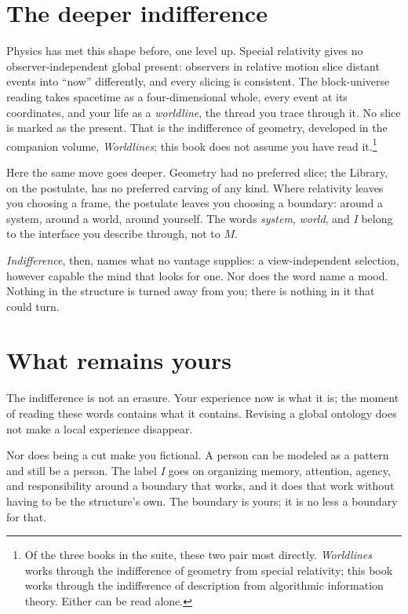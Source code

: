 \section*{The deeper indifference}

Physics has met this shape before, one level up. Special relativity gives no observer-independent global present: observers in relative motion slice distant events into ``now'' differently, and every slicing is consistent. The block-universe reading takes spacetime as a four-dimensional whole, every event at its coordinates, and your life as a \emph{worldline}, the thread you trace through it. No slice is marked as the present. That is the indifference of geometry, developed in the companion volume, \textit{Worldlines}; this book does not assume you have read it.\footnote{Of the three books in the suite, these two pair most directly. \textit{Worldlines} works through the indifference of geometry from special relativity; this book works through the indifference of description from algorithmic information theory. Either can be read alone.}

Here the same move goes deeper. Geometry had no preferred slice; the Library, on the postulate, has no preferred carving of any kind. Where relativity leaves you choosing a frame, the postulate leaves you choosing a boundary: around a system, around a world, around yourself. The words \emph{system}, \emph{world}, and \emph{I} belong to the interface you describe through, not to $M$.

\emph{Indifference}, then, names what no vantage supplies: a view-independent selection, however capable the mind that looks for one. Nor does the word name a mood. Nothing in the structure is turned away from you; there is nothing in it that could turn.

\section*{What remains yours}

The indifference is not an erasure. Your experience now is what it is; the moment of reading these words contains what it contains. Revising a global ontology does not make a local experience disappear.

Nor does being a cut make you fictional. A person can be modeled as a pattern and still be a person. The label \emph{I} goes on organizing memory, attention, agency, and responsibility around a boundary that works, and it does that work without having to be the structure's own. The boundary is yours; it is no less a boundary for that.

